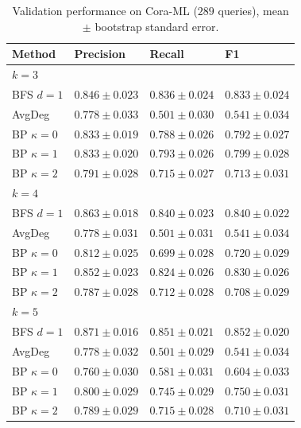 \begin{table}[H]
  \centering
  \scriptsize
  \caption{Validation performance on Cora-ML ($289$ queries), mean $\pm$ bootstrap standard error.}
  \label{tab:validation}
  \begin{tabular}{llll}
    \toprule
    Method & Precision & Recall & F1 \\
    \midrule
    \multicolumn{4}{l}{\textit{$k=3$}} \\
    BFS $d=1$ & $0.846\pm0.023$ & $0.836\pm0.024$ & $0.833\pm0.024$ \\
    AvgDeg & $0.778\pm0.033$ & $0.501\pm0.030$ & $0.541\pm0.034$ \\
    BP $\kappa=0$ & $0.833\pm0.019$ & $0.788\pm0.026$ & $0.792\pm0.027$ \\
    BP $\kappa=1$ & $0.833\pm0.020$ & $0.793\pm0.026$ & $0.799\pm0.028$ \\
    BP $\kappa=2$ & $0.791\pm0.028$ & $0.715\pm0.027$ & $0.713\pm0.031$ \\
    \midrule
    \multicolumn{4}{l}{\textit{$k=4$}} \\
    BFS $d=1$ & $0.863\pm0.018$ & $0.840\pm0.023$ & $0.840\pm0.022$ \\
    AvgDeg & $0.778\pm0.031$ & $0.501\pm0.031$ & $0.541\pm0.034$ \\
    BP $\kappa=0$ & $0.812\pm0.025$ & $0.699\pm0.028$ & $0.720\pm0.029$ \\
    BP $\kappa=1$ & $0.852\pm0.023$ & $0.824\pm0.026$ & $0.830\pm0.026$ \\
    BP $\kappa=2$ & $0.787\pm0.028$ & $0.712\pm0.028$ & $0.708\pm0.029$ \\
    \midrule
    \multicolumn{4}{l}{\textit{$k=5$}} \\
    BFS $d=1$ & $0.871\pm0.016$ & $0.851\pm0.021$ & $0.852\pm0.020$ \\
    AvgDeg & $0.778\pm0.032$ & $0.501\pm0.029$ & $0.541\pm0.034$ \\
    BP $\kappa=0$ & $0.760\pm0.030$ & $0.581\pm0.031$ & $0.604\pm0.033$ \\
    BP $\kappa=1$ & $0.800\pm0.029$ & $0.745\pm0.029$ & $0.750\pm0.031$ \\
    BP $\kappa=2$ & $0.789\pm0.029$ & $0.715\pm0.028$ & $0.710\pm0.031$ \\
    \bottomrule
  \end{tabular}
\end{table}

